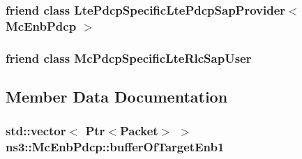 \subsubsection[{\texorpdfstring{Lte\+Pdcp\+Specific\+Lte\+Pdcp\+Sap\+Provider$<$ Mc\+Enb\+Pdcp $>$}{LtePdcpSpecificLtePdcpSapProvider< McEnbPdcp >}}]{\setlength{\rightskip}{0pt plus 5cm}friend class {\bf Lte\+Pdcp\+Specific\+Lte\+Pdcp\+Sap\+Provider}$<$ {\bf Mc\+Enb\+Pdcp} $>$\hspace{0.3cm}{\ttfamily [friend]}}\hypertarget{classns3_1_1McEnbPdcp_a3be5fad687b68405df05738af9554f02}{}\label{classns3_1_1McEnbPdcp_a3be5fad687b68405df05738af9554f02}
\subsubsection[{\texorpdfstring{Mc\+Pdcp\+Specific\+Lte\+Rlc\+Sap\+User}{McPdcpSpecificLteRlcSapUser}}]{\setlength{\rightskip}{0pt plus 5cm}friend class {\bf Mc\+Pdcp\+Specific\+Lte\+Rlc\+Sap\+User}\hspace{0.3cm}{\ttfamily [friend]}}\hypertarget{classns3_1_1McEnbPdcp_aa730947a92e2bd2f95e14427cfad8d6e}{}\label{classns3_1_1McEnbPdcp_aa730947a92e2bd2f95e14427cfad8d6e}


\subsection{Member Data Documentation}
\subsubsection[{\texorpdfstring{buffer\+Of\+Target\+Enb1}{bufferOfTargetEnb1}}]{\setlength{\rightskip}{0pt plus 5cm}std\+::vector$<$ {\bf Ptr}$<${\bf Packet}$>$ $>$ ns3\+::\+Mc\+Enb\+Pdcp\+::buffer\+Of\+Target\+Enb1\hspace{0.3cm}{\ttfamily [private]}}\hypertarget{classns3_1_1McEnbPdcp_a7418919c44f5c3aa473a040b5aeb2abc}{}\label{classns3_1_1McEnbPdcp_a7418919c44f5c3aa473a040b5aeb2abc}
